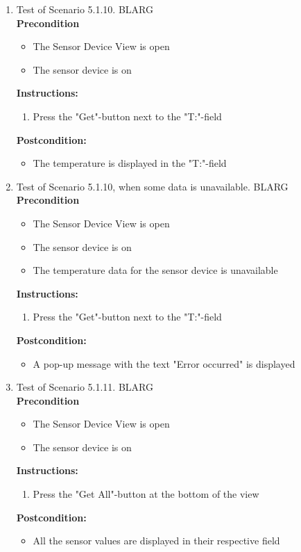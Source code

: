 \documentclass[a4paper]{article}
\newlength{\testlabellength}
\newenvironment{testlist}{\begin{enumerate}[label=\bfseries Instruction \thesubsection.\arabic* , labelindent=0pt, labelwidth=\testlabellength , leftmargin=2cm]}{\end{enumerate}}
\newenvironment{precondition}{
{\color{white}BLARG}\\ 
\textbf{Precondition}
\begin{itemize}[labelindent=0cm, labelwidth=2cm , leftmargin=1cm]
}
{\end{itemize}}
\newenvironment{instruction}{
\textbf{Instructions:}
\begin{enumerate}[label=\bfseries  \arabic*., labelindent=0cm, labelwidth=2cm , leftmargin=1cm]
}
{\end{enumerate}}
\newenvironment{postcondition}{
\textbf{Postcondition:}
\begin{itemize}[labelindent=0cm, labelwidth=2cm , leftmargin=1cm]
}
{\end{itemize}}
\begin{document}
\begin{appendices}
\begin{testlist}
	\item  Test of Scenario 5.1.10.
		\begin{precondition}
			\item The Sensor Device View is open
			\item The sensor device is on
		\end{precondition}
		\begin{instruction}
			\item Press the "Get"-button next to the "T:"-field
		\end{instruction}
		\begin{postcondition}
			\item The temperature is displayed in the "T:"-field
		\end{postcondition}

	\item  Test of Scenario 5.1.10, when some data is unavailable.
		\begin{precondition}
			\item The Sensor Device View is open
			\item The sensor device is on
			\item The temperature data for the sensor device is unavailable
		\end{precondition}
		\begin{instruction}
			\item Press the "Get"-button next to the "T:"-field
		\end{instruction}
		\begin{postcondition}
			\item A pop-up message with the text "Error occurred" is displayed
		\end{postcondition}
        
\newpage
	\item  Test of Scenario 5.1.11.
		\begin{precondition} 
			\item The Sensor Device View is open
			\item The sensor device is on
		\end{precondition}
		\begin{instruction}
			\item Press the "Get All"-button at the bottom of the view
		\end{instruction}
		\begin{postcondition}
			\item All the sensor values are displayed in their respective field
		\end{postcondition}


\end{testlist}
\end{appendices}
\end{document}
